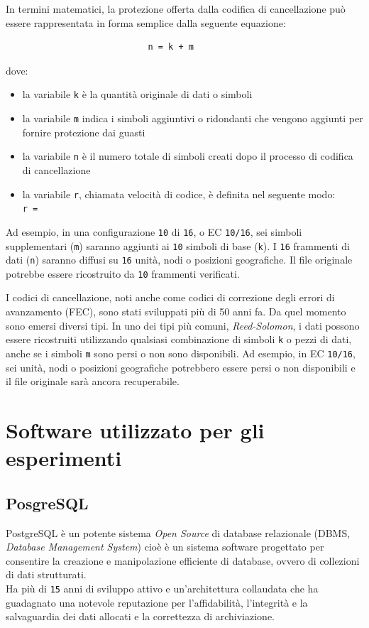 In termini matematici, la protezione offerta dalla codifica di cancellazione pu\`{o} essere rappresentata in forma semplice dalla seguente equazione:  
\begin{verbatim}
                       		n = k + m
\end{verbatim}
dove:
\begin{itemize}
\item 
la variabile \verb"k" \`{e} la quantit\`{a} originale di dati o simboli 
\item
la variabile \verb"m" indica i simboli aggiuntivi o ridondanti che vengono aggiunti per fornire protezione dai guasti
\item
la variabile \verb"n" \`{e} il numero totale di simboli creati dopo il processo di codifica di cancellazione\cite{etichetta11}
\item
la variabile \verb"r", chiamata velocit\`{a} di codice, \`{e} definita nel seguente modo: \\

						\verb"r = "
                       		
\end{itemize}

Ad esempio, in una configurazione \verb"10" di \verb"16", o EC \verb"10/16", sei simboli supplementari (\verb"m") saranno aggiunti ai \verb"10" simboli di base (\verb"k"). I \verb"16" frammenti di dati (\verb"n") saranno diffusi su \verb"16" unit\`{a}, nodi o posizioni geografiche. Il file originale potrebbe essere ricostruito da \verb"10" frammenti verificati.\cite{etichetta11}

I codici di cancellazione, noti anche come codici di correzione degli errori di avanzamento (FEC), sono stati sviluppati pi\`{u} di 50 anni fa. Da quel momento sono emersi diversi tipi. In uno dei tipi pi\`{u} comuni, \textit{Reed-Solomon}, i dati possono essere ricostruiti utilizzando qualsiasi combinazione di simboli \verb"k" o pezzi di dati, anche se i simboli \verb"m" sono persi o non sono disponibili. Ad esempio, in EC \verb"10/16", sei unit\`{a}, nodi o posizioni geografiche potrebbero essere persi o non disponibili e il file originale sar\`{a} ancora recuperabile.\cite{etichetta11}
 
\item
\section{Software utilizzato per gli esperimenti}
\item
\subsection{PosgreSQL}
PostgreSQL \`{e} un potente sistema \textit{Open Source} di database relazionale (DBMS, \textit{Database Management System}) cio\`{e} \`{e} un sistema software progettato per consentire la creazione e manipolazione efficiente di database, ovvero di collezioni di dati strutturati.\\ 
Ha pi\`{u} di \verb"15" anni di sviluppo attivo e un'architettura collaudata che ha guadagnato una notevole reputazione per l'affidabilit\`{a}, l'integrit\`{a} e la salvaguardia dei dati allocati e la correttezza di archiviazione.

